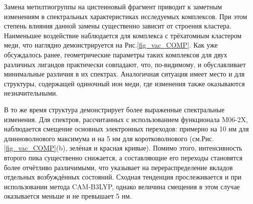 \documentclass[a4paper,12pt]{article}
\newcommand{\ths}{\thinspace}
\begin{document}
\begin{onehalfspace}
	

	Замена метилтиогруппы на цистеиновый фрагмент приводит к заметным изменениям в спектральных характеристиках исследуемых комплексов. При этом степень влияния данной замены существенно зависит от строения кластера. Наименьшее воздействие наблюдается для комплекса с трёхатомным кластером меди, что наглядно демонстрируется на Рис.\ths\ref{fig_vac_COMP}. Как уже обсуждалось ранее, геометрические параметры таких комплексов для двух различных лигандов практически совпадают, что, по-видимому, и обуславливает минимальные различия в их спектрах. Аналогичная ситуация имеет место и для структуры, содержащей одиночный ион меди, где изменения также оказываются незначительными.
	
	В то же время структура  демонстрирует более выраженные спектральные изменения. Для спектров, рассчитанных с использованием функционала M06-2X, наблюдается смещение основных электронных переходов: примерно на 10 нм для длинноволнового максимума и на 5 нм для коротковолнового (см.\ths Рис.\ths\ref{fig_vac_COMP}\ths(b), зелёная и красная кривые). Помимо этого, интенсивность второго пика существенно снижается, а составляющие его переходы становятся более отчётливо различимыми, что указывает на перераспределение вкладов отдельных возбуждённых состояний. Сходная тенденция прослеживается и при использовании метода CAM-B3LYP, однако величина смещения в этом случае оказывается меньше и не превышает 5 нм.
	

\end{onehalfspace}
\end{document}
